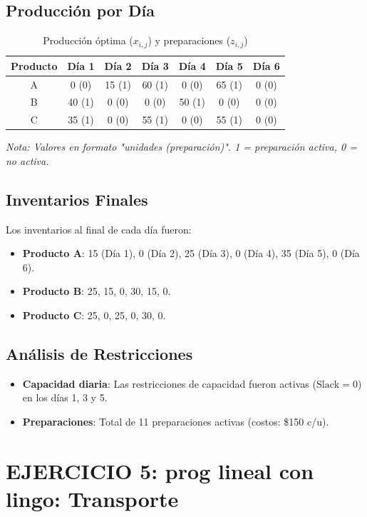 \documentclass[12pt, a4paper, oneside]{book}
\theoremstyle{definition}
\begin{document}
\subsection{Producción por Día}
\begin{table}[h!]
\centering
\caption{Producción óptima ($x_{i,j}$) y preparaciones ($z_{i,j}$)}
\begin{tabular}{|c|c|c|c|c|c|c|}
\hline
\textbf{Producto} & \textbf{Día 1} & \textbf{Día 2} & \textbf{Día 3} & \textbf{Día 4} & \textbf{Día 5} & \textbf{Día 6} \\ \hline
A & 0 (0) & 15 (1) & 60 (1) & 0 (0) & 65 (1) & 0 (0) \\ \hline
B & 40 (1) & 0 (0) & 0 (0) & 50 (1) & 0 (0) & 0 (0) \\ \hline
C & 35 (1) & 0 (0) & 55 (1) & 0 (0) & 55 (1) & 0 (0) \\ \hline
\end{tabular}
\label{tab:produccion}
\end{table}
\textit{Nota: Valores en formato "unidades (preparación)". 1 = preparación activa, 0 = no activa.}

\subsection{Inventarios Finales}
Los inventarios al final de cada día fueron:
\begin{itemize}
    \item \textbf{Producto A}: 15 (Día 1), 0 (Día 2), 25 (Día 3), 0 (Día 4), 35 (Día 5), 0 (Día 6).
    \item \textbf{Producto B}: 25, 15, 0, 30, 15, 0.
    \item \textbf{Producto C}: 25, 0, 25, 0, 30, 0.
\end{itemize}

\subsection{Análisis de Restricciones}
\begin{itemize}
    \item \textbf{Capacidad diaria}: Las restricciones de capacidad fueron activas ($\text{Slack} = 0$) en los días 1, 3 y 5.
    \item \textbf{Preparaciones}: Total de 11 preparaciones activas (costos: \$150 c/u).
\end{itemize}

\newpage
\section{EJERCICIO 5: prog lineal con lingo: Transporte}
\end{document}
